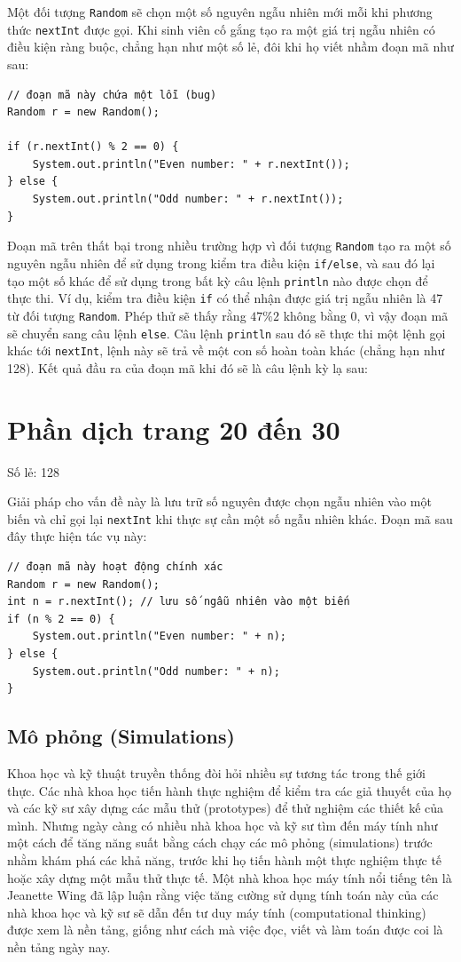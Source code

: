 Một đối tượng \texttt{Random} sẽ chọn một số nguyên ngẫu nhiên mới mỗi khi phương thức \texttt{nextInt} được gọi. Khi sinh viên cố gắng tạo ra một giá trị ngẫu nhiên có điều kiện ràng buộc, chẳng hạn như một số lẻ, đôi khi họ viết nhầm đoạn mã như sau:
\begin{verbatim}
// đoạn mã này chứa một lỗi (bug)
Random r = new Random(); 
 
if (r.nextInt() % 2 == 0) {
    System.out.println("Even number: " + r.nextInt());
} else {
    System.out.println("Odd number: " + r.nextInt());
}
\end{verbatim}

Đoạn mã trên thất bại trong nhiều trường hợp vì đối tượng \texttt{Random} tạo ra một số nguyên ngẫu nhiên để sử dụng trong kiểm tra điều kiện \texttt{if/else}, và sau đó lại tạo một số khác để sử dụng trong bất kỳ câu lệnh \texttt{println} nào được chọn để thực thi. Ví dụ, kiểm tra điều kiện \texttt{if} có thể nhận được giá trị ngẫu nhiên là 47 từ đối tượng \texttt{Random}. Phép thử sẽ thấy rằng $47 \% 2$ không bằng 0, vì vậy đoạn mã sẽ chuyển sang câu lệnh \texttt{else}. Câu lệnh \texttt{println} sau đó sẽ thực thi một lệnh gọi khác tới \texttt{nextInt}, lệnh này sẽ trả về một con số hoàn toàn khác (chẳng hạn như 128). Kết quả đầu ra của đoạn mã khi đó sẽ là câu lệnh kỳ lạ sau:
\section{Phần dịch trang 20 đến 30}
Số lẻ: 128

Giải pháp cho vấn đề này là lưu trữ số nguyên được chọn ngẫu nhiên vào một biến và chỉ gọi lại \texttt{nextInt} khi thực sự cần một số ngẫu nhiên khác. Đoạn mã sau đây thực hiện tác vụ này:

\begin{verbatim}
// đoạn mã này hoạt động chính xác
Random r = new Random();
int n = r.nextInt(); // lưu số ngẫu nhiên vào một biến
if (n % 2 == 0) {
    System.out.println("Even number: " + n);
} else {
    System.out.println("Odd number: " + n);
}
\end{verbatim}

\subsection*{Mô phỏng (Simulations)}

Khoa học và kỹ thuật truyền thống đòi hỏi nhiều sự tương tác trong thế giới thực. Các nhà khoa học tiến hành thực nghiệm để kiểm tra các giả thuyết của họ và các kỹ sư xây dựng các mẫu thử (prototypes) để thử nghiệm các thiết kế của mình. Nhưng ngày càng có nhiều nhà khoa học và kỹ sư tìm đến máy tính như một cách để tăng năng suất bằng cách chạy các mô phỏng (simulations) trước nhằm khám phá các khả năng, trước khi họ tiến hành một thực nghiệm thực tế hoặc xây dựng một mẫu thử thực tế. Một nhà khoa học máy tính nổi tiếng tên là Jeanette Wing đã lập luận rằng việc tăng cường sử dụng tính toán này của các nhà khoa học và kỹ sư sẽ dẫn đến tư duy máy tính (computational thinking) được xem là nền tảng, giống như cách mà việc đọc, viết và làm toán được coi là nền tảng ngày nay.

